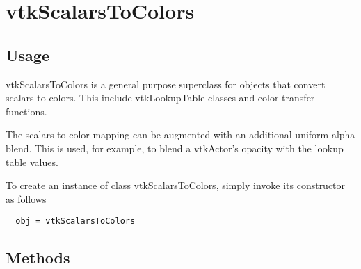 \section{vtkScalarsToColors}

\subsection{Usage}

 vtkScalarsToColors is a general purpose superclass for objects that
 convert scalars to colors. This include vtkLookupTable classes and
 color transfer functions.

 The scalars to color mapping can be augmented with an additional
 uniform alpha blend. This is used, for example, to blend a vtkActor's
 opacity with the lookup table values.


To create an instance of class vtkScalarsToColors, simply
invoke its constructor as follows
\begin{verbatim}
  obj = vtkScalarsToColors
\end{verbatim}
\subsection{Methods}

